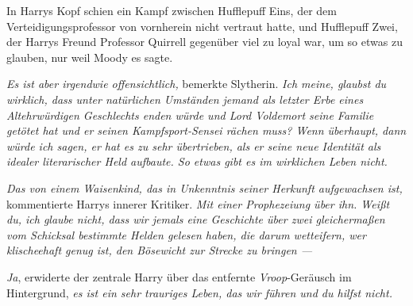 In Harrys Kopf schien ein Kampf zwischen Hufflepuff Eins, der dem Verteidigungsprofessor von vornherein nicht vertraut hatte, und Hufflepuff Zwei, der Harrys Freund Professor Quirrell gegenüber viel zu loyal war, um so etwas zu glauben, nur weil Moody es sagte.

\emph{Es \emph{ist} aber irgendwie offensichtlich,} bemerkte Slytherin. \emph{Ich meine, glaubst du wirklich, dass unter natürlichen Umständen jemand als letzter Erbe eines Altehrwürdigen Geschlechts enden würde \emph{und} Lord Voldemort seine Familie getötet hat \emph{und} er seinen Kampfsport-Sensei rächen muss? Wenn überhaupt, dann würde ich sagen, er hat es zu sehr übertrieben, als er seine neue Identität als idealer literarischer Held aufbaute. So etwas gibt es im wirklichen Leben nicht.}

\emph{Das von einem Waisenkind, das in Unkenntnis seiner Herkunft aufgewachsen ist,} kommentierte Harrys innerer Kritiker. \emph{Mit einer Prophezeiung über ihn. Weißt du, ich glaube nicht, dass wir jemals eine Geschichte über zwei gleichermaßen vom Schicksal bestimmte Helden gelesen haben, die darum wetteifern, wer klischeehaft genug ist, den Bösewicht zur Strecke zu bringen —}

\emph{Ja}, erwiderte der zentrale Harry über das entfernte \emph{Vroop}-Geräusch im Hintergrund, \emph{es ist ein sehr trauriges Leben, das wir führen und \emph{du hilfst nicht}.}

